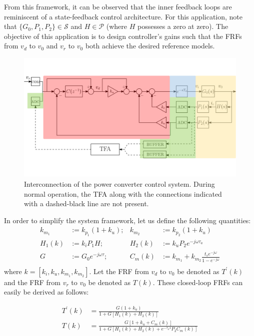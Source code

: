 \documentclass[a4paper, 10pt, conference]{ieeeconf}
\begin{document}
From this framework, it can be observed that the inner feedback loops are reminiscent of a state-feedback control architecture. For this application, note that $\{G_0,P_1,P_2 \} \in \mathscr{S}$ and $H \in \mathscr{P}$ (where $H$ possesses a zero at zero). The objective of this application is to design controller's gains such that the FRFs from $v_d$ to $v_0$ and $v_r$ to $v_0$ both achieve the desired reference models.
\begin{figure}
\centering
\includegraphics[width=1.6\columnwidth]{../pics/voltage_loop_color_coded}
\caption{Interconnection of the power converter control system. During normal operation, the TFA along with the connections indicated with a dashed-black line are not present.}
\label{fig:damping_loop}
\end{figure}

In order to simplify the system framework, let us define the following quantities:
\begin{equation} \label{eq:new_var}
\begin{aligned}
k_{m_1} &:= k_{p_1}(1+k_u) ;  &k_{m_2} &:= k_{p_2}(1+k_u)  \\
H_1(k) &:= k_iP_1H;  &H_2(k) &:= k_uP_2e^{-j\omega \tau_{a}} \\
G &:= G_0e^{-j\omega\tau}; &C_m(k) &:= k_{m_1}+k_{m_2}\frac{t_se^{-j\omega}}{1-e^{-j\omega}}\\ 
\end{aligned}
\end{equation}
where $k = [k_i,k_u,k_{m_1},k_{m_2}]$. Let the FRF from $v_d$ to $v_0$ be denoted as $T^{\prime}(k)$ and the FRF from $v_r$ to $v_0$ be denoted as $T(k)$. These closed-loop FRFs can easily be derived as follows:

\begin{align}
T^{\prime}(k) &= \frac{G(1+k_u)}{1+G[H_1(k)+H_2(k)]} \label{eq:Tclp}  \\ 
T(k) &= \frac{G[1+k_u+C_m(k)]}{1+G[H_1(k)+H_2(k)+e^{-\tau_{a}s} P_2C_m(k)]}  \label{eq:Tcl} 
\end{align}
\end{document}
